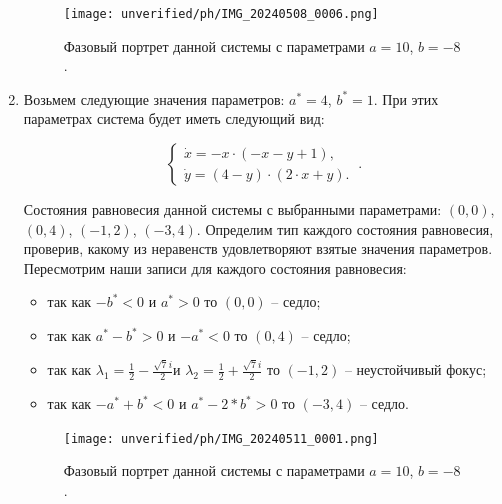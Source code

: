 \begin{enumerate}
\begin{figure}[!thb]
\texttt{[image: unverified/ph/IMG\_20240508\_0006.png]}
\centering
\caption{\label{fig:bifdiag2} Фазовый портрет данной системы с параметрами $a = 10$, $b = -8$.}
\end{figure}

\newpage
\item
Возьмем следующие значения параметров:  $a^\ast = 4$, $b^\ast = 1$. При этих параметрах система будет иметь следующий вид: 

$$
\left \lbrace 
\begin{matrix} 
\dot{x} = -x \cdot (-x - y + 1), \\
\dot{y} = (4 - y) \cdot (2 \cdot x + y). \
\end{matrix} 
\right . .$$

Состояния равновесия данной системы с выбранными параметрами: $(0, 0)$, $(0, 4)$, $(-1, 2)$, $(-3, 4)$. Определим тип каждого состояния равновесия, проверив, какому из неравенств удовлетворяют взятые значения параметров.  Пересмотрим наши записи для каждого состояния равновесия: 
\begin{itemize}
\item{ так как $-b^\ast  < 0 $ и $a^\ast > 0 $ то $(0, 0)$ -- седло;}
\item{ так как $a^\ast - b^\ast > 0 $ и $-a^\ast  < 0 $ то $(0, 4)$ -- седло;}
\item{ так как ${\lambda_{1}} = \frac{1}{2} - \frac{\sqrt{7} i}{2} $и ${\lambda_{2}} = \frac{1}{2} + \frac{\sqrt{7} i}{2}$ то $(-1, 2)$ -- неустойчивый фокус;}
\item{ так как $-a^\ast + b^\ast  < 0 $ и $a^\ast - 2*b^\ast > 0 $ то $(-3, 4)$ -- седло.}
\end{itemize} 
\begin{figure}[!thb]
\texttt{[image: unverified/ph/IMG\_20240511\_0001.png]}
\centering
\caption{\label{fig:bifdiag2} Фазовый портрет данной системы с параметрами $a = 10$, $b = -8$.}
\end{figure}

\end{enumerate}

